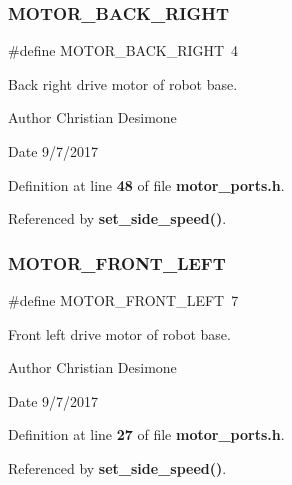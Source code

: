 \subsubsection{M\+O\+T\+O\+R\+\_\+\+B\+A\+C\+K\+\_\+\+R\+I\+G\+HT}
{\footnotesize\ttfamily \#define M\+O\+T\+O\+R\+\_\+\+B\+A\+C\+K\+\_\+\+R\+I\+G\+HT~4}



Back right drive motor of robot base. 

\begin{DoxyAuthor}{Author}
Christian Desimone 
\end{DoxyAuthor}
\begin{DoxyDate}{Date}
9/7/2017 
\end{DoxyDate}


Definition at line \textbf{ 48} of file \textbf{ motor\+\_\+ports.\+h}.



Referenced by \textbf{ set\+\_\+side\+\_\+speed()}.

\mbox{\label{motor__ports_8h_a743b47e164fb23b30f4f2f228db0b338}} 
\subsubsection{M\+O\+T\+O\+R\+\_\+\+F\+R\+O\+N\+T\+\_\+\+L\+E\+FT}
{\footnotesize\ttfamily \#define M\+O\+T\+O\+R\+\_\+\+F\+R\+O\+N\+T\+\_\+\+L\+E\+FT~7}



Front left drive motor of robot base. 

\begin{DoxyAuthor}{Author}
Christian Desimone 
\end{DoxyAuthor}
\begin{DoxyDate}{Date}
9/7/2017 
\end{DoxyDate}


Definition at line \textbf{ 27} of file \textbf{ motor\+\_\+ports.\+h}.



Referenced by \textbf{ set\+\_\+side\+\_\+speed()}.

\mbox{\label{motor__ports_8h_a6f48bcc6d5fce24caeae0b17954c277a}} 
